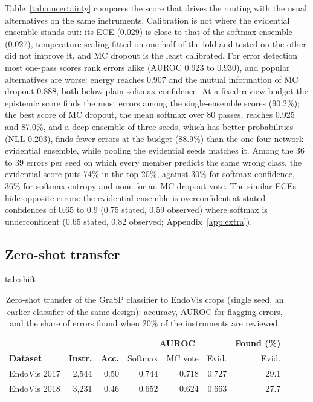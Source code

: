 Table~\ref{tab:uncertainty} compares the score that drives the routing with the usual alternatives on the same instruments.
Calibration is not where the evidential ensemble stands out: its ECE (0.029) is close to that of the softmax ensemble (0.027), temperature scaling fitted on one half of the fold and tested on the other did not improve it, and MC dropout is the least calibrated.
For error detection most one-pass scores rank errors alike (AUROC 0.923 to 0.930), and popular alternatives are worse: energy reaches 0.907 and the mutual information of MC dropout 0.888, both below plain softmax confidence.
At a fixed review budget the epistemic score finds the most errors among the single-ensemble scores (90.2\%); the best score of MC dropout, the mean softmax over 80 passes, reaches 0.925 and 87.0\%, and a deep ensemble of three seeds, which has better probabilities (NLL 0.203), finds fewer errors at the budget (88.9\%) than the one four-network evidential ensemble, while pooling the evidential seeds matches it.
Among the 36 to 39 errors per seed on which every member predicts the same wrong class, the evidential score puts 74\% in the top 20\%, against 30\% for softmax confidence, 36\% for softmax entropy and none for an MC-dropout vote.
The similar ECEs hide opposite errors: the evidential ensemble is overconfident at stated confidences of 0.65 to 0.9 (0.75 stated, 0.59 observed) where softmax is underconfident (0.65 stated, 0.82 observed; Appendix~\ref{app:extra}).

\subsection{Zero-shot transfer}
\label{sec:shift}
\begin{table}[ht!]
\floatconts
  {tab:shift}
  {\caption{Zero-shot transfer of the GraSP classifier to EndoVis crops (single seed, an earlier classifier of the same design): accuracy, AUROC for flagging errors, and the share of errors found when 20\% of the instruments are reviewed. }}
  {\footnotesize\setlength{\tabcolsep}{4pt}\begin{tabular}{lrrrrrr}
  \toprule
  & & & \multicolumn{3}{c}{\bfseries AUROC} & \bfseries Found (\%)\\
  \bfseries Dataset & \bfseries Instr. & \bfseries Acc. & Softmax & MC vote & Evid. & Evid.\\
  \midrule
  EndoVis 2017 & 2,544 & 0.50 & 0.744 & 0.718 & 0.727 & 29.1\\
  EndoVis 2018 & 3,231 & 0.46 & 0.652 & 0.624 & 0.663 & 27.7\\
  \bottomrule
  \end{tabular}}
\end{table}

